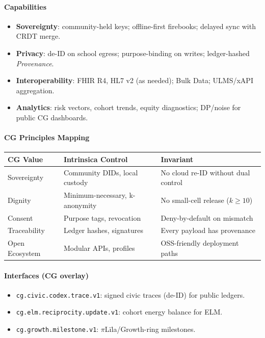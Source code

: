 \documentclass[11pt]{article}
\theoremstyle{plain}
\begin{document}
\paragraph{Capabilities}
\begin{itemize}
  \item \textbf{Sovereignty}: community-held keys; offline-first firebooks; delayed sync with CRDT merge.
  \item \textbf{Privacy}: de-ID on school egress; purpose-binding on writes; ledger-hashed \emph{Provenance}.
  \item \textbf{Interoperability}: FHIR R4, HL7 v2 (as needed); Bulk Data; ULMS/xAPI aggregation.
  \item \textbf{Analytics}: risk vectors, cohort trends, equity diagnostics; DP/noise for public CG dashboards.
\end{itemize}

\paragraph{CG Principles Mapping}
\begin{center}
\begin{tabular}{l l l}
\hline
CG Value & Intrinsica Control & Invariant \\
\hline
Sovereignty & Community DIDs, local custody & No cloud re-ID without dual control \\
Dignity & Minimum-necessary, k-anonymity & No small-cell release ($k\ge10$) \\
Consent & Purpose tags, revocation & Deny-by-default on mismatch \\
Traceability & Ledger hashes, signatures & Every payload has provenance \\
Open Ecosystem & Modular APIs, profiles & OSS-friendly deployment paths \\
\hline
\end{tabular}
\end{center}

\paragraph{Interfaces (CG overlay)}
\begin{itemize}
  \item \texttt{cg.civic.codex.trace.v1}: signed civic traces (de-ID) for public ledgers.
  \item \texttt{cg.elm.reciprocity.update.v1}: cohort energy balance for ELM.
  \item \texttt{cg.growth.milestone.v1}: $\pi$Līla/Growth-ring milestones.
\end{itemize}
\end{document}
